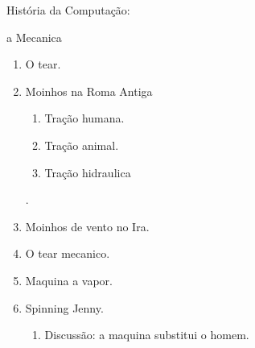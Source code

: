 {\Large História da Computação:
	
	a Mecanica}

\begin{enumerate}
	\item O tear.
	\item Moinhos na Roma Antiga
	\begin{enumerate}
		\item Tração humana.
		\item Tração animal.
		\item Tração hidraulica
	\end{enumerate}.
	\item Moinhos de vento no Ira.
	\item O tear mecanico.
	\item Maquina a vapor.
	\item Spinning Jenny.
	\begin{enumerate}
		\item Discussão: a maquina substitui o homem.
	\end{enumerate}
\end{enumerate}
